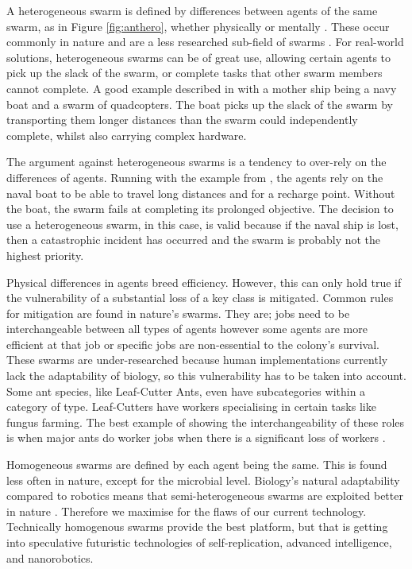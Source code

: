 \documentclass{UoYCSproject}
\begin{document}
A heterogeneous swarm is defined by differences between agents of the same swarm, as in Figure \ref{fig:anthero}, whether physically or mentally \cite{Swarm robotics reviewed, Swarm intellegiegence}.
These occur commonly in nature and are a less researched sub-field of swarms \cite{Swarm intellegiegence}.
For real-world solutions, heterogeneous swarms can be of great use, allowing certain agents to pick up the slack of the swarm, or complete tasks that other swarm members cannot complete.
A good example described in \cite{Swarm robotics reviewed} with a mother ship being a navy boat and a swarm of quadcopters.
The boat picks up the slack of the swarm by transporting them longer distances than the swarm could independently complete, whilst also carrying complex hardware.

The argument against heterogeneous swarms is a tendency to over-rely on the differences of agents.
Running with the example from \cite{Swarm robotics reviewed}, the agents rely on the naval boat to be able to travel long distances and for a recharge point.
Without the boat, the swarm fails at completing its prolonged objective.
The decision to use a heterogeneous swarm, in this case, is valid because if the naval ship is lost, then a catastrophic incident has occurred and the swarm is probably not the highest priority.

Physical differences in agents breed efficiency.
However, this can only hold true if the vulnerability of a substantial loss of a key class is mitigated.
Common rules for mitigation are found in nature's swarms.
They are; jobs need to be interchangeable between all types of agents however some agents are more efficient at that job \cite{Ant communication} or specific jobs are non-essential to the colony's survival.
These swarms are under-researched because human implementations currently lack the adaptability of biology, so this vulnerability has to be taken into account.
Some ant species, like Leaf-Cutter Ants, even have subcategories within a category of type.
Leaf-Cutters have workers specialising in certain tasks like fungus farming.
The best example of showing the interchangeability of these roles is when major ants do worker jobs when there is a significant loss of workers \cite{Swarm intellegiegence}.

Homogeneous swarms are defined by each agent being the same.
This is found less often in nature, except for the microbial level.
Biology's natural adaptability compared to robotics means that semi-heterogeneous swarms are exploited better in nature \cite{Swarm robotics reviewed, Swarm intellegiegence}.
Therefore we maximise for the flaws of our current technology.
Technically homogenous swarms provide the best platform, but that is getting into speculative futuristic technologies of self-replication, advanced intelligence, and nanorobotics.
\end{document}
